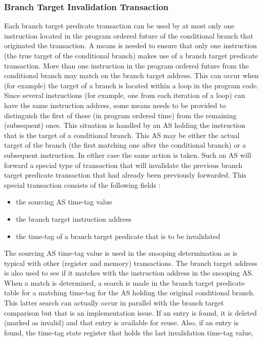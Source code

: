 \documentclass[10pt,dvips]{article}
\begin{document}
\subsubsection{Branch Target Invalidation Transaction}
%
Each branch target predicate transaction can be used by at most only
one instruction located in the program ordered future of the
conditional branch that originated the transaction.
A means is needed to ensure that only one instruction (the true
target of the conditional branch) makes use of a branch target
predicate transaction.
More than one instruction in the program ordered future from
the conditional branch may match on the branch target address.
This can occur when (for example) the target of a branch is
located within a loop in the program code.
Since several instructions (for example, one from each iteration of a loop) 
can have the same instruction
address, some means needs to be provided to distinguish the
first of these (in program ordered time) from the remaining (subsequent) ones.
This situation is handled by an AS holding the instruction that
is the 
target of a conditional branch.  
This AS may be either the actual target of the branch (the first
matching one after the conditional branch) or a subsequent instruction.
In either case the same action is taken.
Such an AS will forward a special type of
transaction that will invalidate the previous branch target
predicate transaction that had already been previously forwarded.
This special transaction consists of the following fields :
%
\begin{itemize}
\item{the sourcing AS time-tag value}
\item{the branch target instruction address}
\item{the time-tag of a branch target predicate that is to be invalidated}
\end{itemize}   
%
The sourcing AS time-tag value is used in the snooping
determination as is typical with other (register and memory) transactions.
The branch target address is also used to see if it matches with
the instruction address in the snooping AS.
When a match is determined,
a search is made in the branch target
predicate table for a matching time-tag for the AS holding the original
conditional branch.  This latter search can actually occur in parallel
with the branch target comparison but that is an implementation issue.
If an entry is found, it is deleted (marked as
invalid) and that
entry is available for reuse.  Also, if an entry is found, the time-tag
state register that holds the last invalidation time-tag value,
\end{document}
